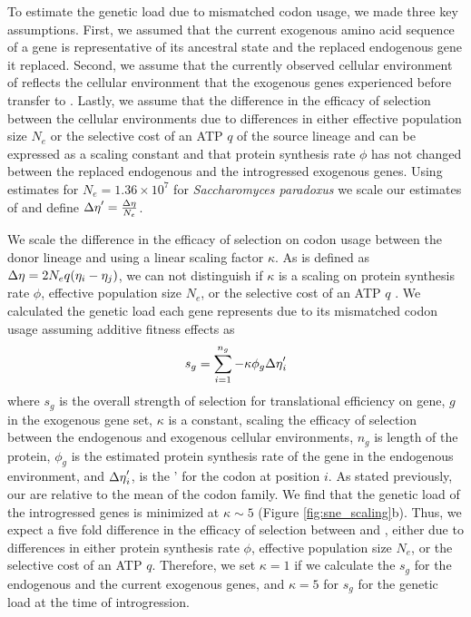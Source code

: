 \documentclass[fleqn,letterpaper]{article}
\begin{document}
To estimate the genetic load due to mismatched codon usage, we made three key assumptions.
First, we assumed that the current exogenous amino acid sequence of a gene is representative of its ancestral state and the replaced endogenous gene it replaced.
Second, we assume that the currently observed cellular environment of \gossypii reflects the cellular environment that the exogenous genes experienced before transfer to \kluyveri.
Lastly, we assume that the difference in the efficacy of selection between the cellular environments due to differences in either effective population size $N_e$ or the selective cost of an ATP $q$ of the source lineage and \kluyveri can be expressed as a scaling constant and that protein synthesis rate $\phi$ has not changed between the replaced endogenous and the introgressed exogenous genes.
Using estimates for $N_e = 1.36\times10^7$ \citep{wagner2005} for \textit{Saccharomyces paradoxus} we scale our estimates of \DE and define ${\Delta \eta}' = \frac{{\Delta \eta}}{N_e}$.

We scale the difference in the efficacy of selection on codon usage between the donor lineage and \kluyveri using a linear scaling factor $\kappa$.
As \DE is defined as ${\Delta \eta} = 2N_eq(\eta_i-\eta_j)$, we can not distinguish if $\kappa$ is a scaling on protein synthesis rate $\phi$, effective population size $N_e$, or the selective cost of an ATP $q$ \citep{gilchrist2007, gilchrist2015}.
We calculated the genetic load each gene represents due to its mismatched codon usage assuming additive fitness effects as 
\begin{equation}
s_g = \sum_{i=1}^{n_g} -\kappa \phi_g {\Delta \eta}'_i 
\end{equation}
where $s_g$ is the overall strength of selection for translational efficiency on gene, $g$  in the exogenous gene set, $\kappa$ is a constant, scaling the efficacy of selection between the endogenous and exogenous cellular environments, $n_{g}$ is length of the protein, $\phi_g$ is the estimated protein synthesis rate of the gene in the endogenous environment, and ${\Delta \eta}'_i$, is the \DE' for the codon at position $i$.
As stated previously, our \DE are relative to the mean of the codon family.
We find that the genetic load of the introgressed genes is minimized at $\kappa \sim 5$ (Figure \ref{fig:sne_scaling}b).
Thus, we expect a five fold difference in the efficacy of selection between \kluyveri and \gossypii, either due to differences in either protein synthesis rate $\phi$, effective population size $N_e$, or the selective cost of an ATP $q$.
Therefore, we set $\kappa = 1$ if we calculate the $s_g$ for the endogenous and the current exogenous genes, and $\kappa = 5$ for $s_g$ for the genetic load at the time of introgression.
\end{document}
